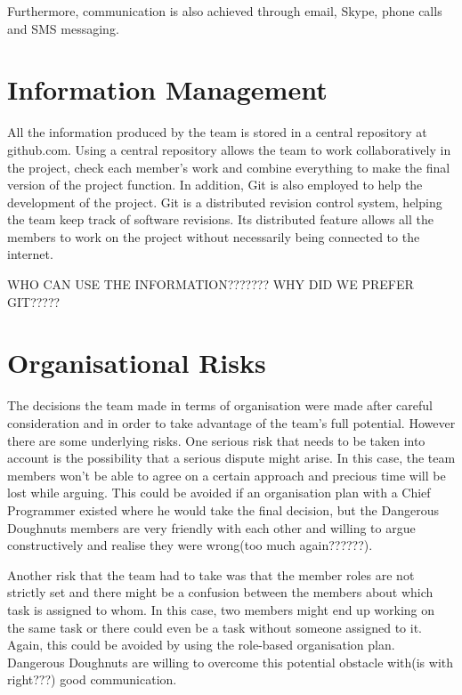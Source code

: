 \documentclass{article}
\begin{document}
Furthermore, communication is also achieved through email, Skype, phone calls and SMS messaging.


\section{Information Management}
\label{info}

All the information produced by the team is stored in a central repository at github.com. Using a central repository allows the team to work collaboratively in the project, check each member's work and combine everything to make the final version of the project function. In addition, Git is also employed to help the development of the project. Git is a distributed revision control system, helping the team keep track of software revisions. Its distributed feature allows all the members to work on the project without necessarily being connected to the internet.

WHO CAN USE THE INFORMATION??????? WHY DID WE PREFER GIT?????



\section{Organisational Risks}
\label{lastSection}

The decisions the team made in terms of organisation were made after careful consideration and in order to take advantage of the team's full potential. However there are some underlying risks. One serious risk that needs to be taken into account is the possibility that a serious dispute might arise. In this case, the team members won't be able to agree on a certain approach and precious time will be lost while arguing. This could be avoided if an organisation plan with a Chief Programmer existed where he would take the final decision, but the Dangerous Doughnuts members are very friendly with each other and willing to argue constructively and realise they were wrong(too much again??????).

Another risk that the team had to take was that the member roles are not strictly set and there might be a confusion between the members about which task is assigned to whom. In this case, two members might end up working on the same task or there could even be a task without someone assigned to it. Again, this could be avoided by using the role-based organisation plan. Dangerous Doughnuts are willing to overcome this potential obstacle with(is with right???) good communication.




\end{document}

